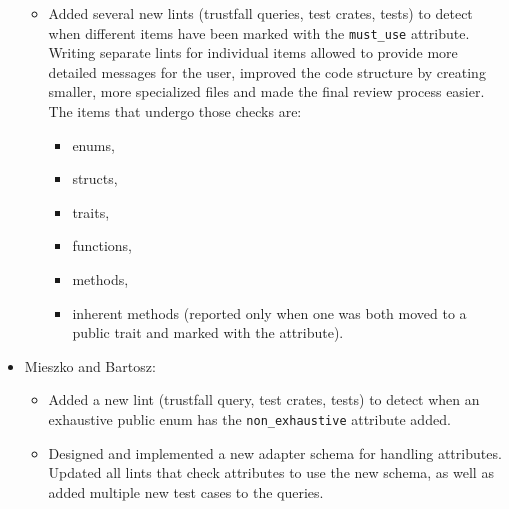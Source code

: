 \documentclass[licencjacka,en]{pracamgr}
\begin{document}
\begin{itemize}
\begin{itemize}


			\item Added several new lints (trustfall queries, test crates, tests)
				to detect when different items have been marked with the \texttt{must\_use}
				attribute. Writing separate lints for individual items allowed to provide more
				detailed messages for the user, improved the code structure by creating smaller,
				more specialized files and made the final review process easier. The items that
				undergo those checks are:
				\begin{itemize}
					\item enums,
					\item structs,
					\item traits,
					\item functions,
					\item methods,
					\item inherent methods (reported only when one was both moved to
						a public trait and marked with the attribute).
				\end{itemize}
		\end{itemize}

	\item Mieszko and Bartosz:
		\begin{itemize}
			\item Added a new lint (trustfall query, test crates, tests) to detect when an exhaustive
				public enum has the \texttt{non\_exhaustive} attribute added.
			\item Designed and implemented a new adapter schema for handling attributes.
				Updated all lints that check attributes to use the new schema, as well as added multiple
				new test cases to the queries.
		\end{itemize}
\end{itemize}
\end{document}

